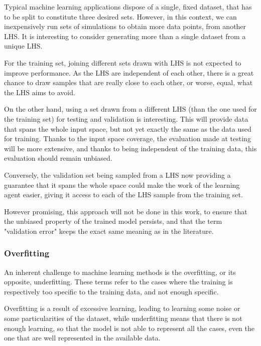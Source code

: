 Typical machine learning applications dispose of a single, fixed dataset, that has to be split to constitute three desired sets. However, in this context, we can inexpensively run sets of simulations to obtain more data points, from another LHS. It is interesting to consider generating more than a single dataset from a unique LHS.

For the training set, joining different sets drawn with LHS is not expected to improve performance. As the LHS are independent of each other, there is a great chance to draw samples that are really close to each other, or worse, equal, what the LHS aims to avoid.

On the other hand, using a set drawn from a different LHS (than the one used for the training set) for testing and validation is interesting. This will provide data that spans the whole input space, but not yet exactly the same as the data used for training. Thanks to the input space coverage, the evaluation made at testing will be more extensive, and thanks to being independent of the training data, this evaluation should remain unbiased. 

Conversely, the validation set being sampled from a LHS now providing a guarantee that it spans the whole space could make the work of the learning agent easier, giving it access to each of the LHS sample from the training set.

However promising, this approach will not be done in this work, to ensure that the unbiased property of the trained model persists, and that the term "validation error" keeps the exact same meaning as in the literature.

\subsubsection{Overfitting}

An inherent challenge to machine learning methods is the overfitting, or its opposite, underfitting. These terms refer to the cases where the training is respectively too specific to the training data, and not enough specific.

Overfitting is a result of excessive learning, leading to learning some noise or some particularities of the dataset, while underfitting means that there is not enough learning, so that the model is not able to represent all the cases, even the one that are well represented in the available data.

